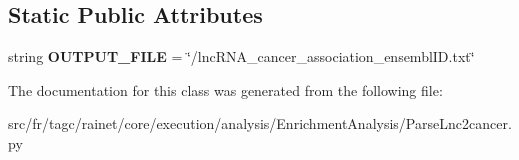 \subsection*{Static Public Attributes}
\begin{DoxyCompactItemize}
\item 
\hypertarget{classsrc_1_1fr_1_1tagc_1_1rainet_1_1core_1_1execution_1_1analysis_1_1EnrichmentAnalysis_1_1ParseLnc2cancer_1_1ParseLnc2cancer_a7d18d13d9b36b55b7d99941fe7eaee3a}{string {\bfseries O\-U\-T\-P\-U\-T\-\_\-\-F\-I\-L\-E} = \char`\"{}/lnc\-R\-N\-A\-\_\-cancer\-\_\-association\-\_\-ensembl\-I\-D.\-txt\char`\"{}}\label{classsrc_1_1fr_1_1tagc_1_1rainet_1_1core_1_1execution_1_1analysis_1_1EnrichmentAnalysis_1_1ParseLnc2cancer_1_1ParseLnc2cancer_a7d18d13d9b36b55b7d99941fe7eaee3a}

\end{DoxyCompactItemize}


The documentation for this class was generated from the following file\-:\begin{DoxyCompactItemize}
\item 
src/fr/tagc/rainet/core/execution/analysis/\-Enrichment\-Analysis/Parse\-Lnc2cancer.\-py\end{DoxyCompactItemize}
